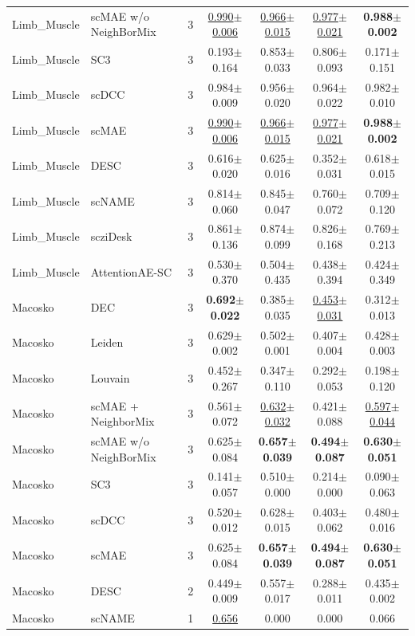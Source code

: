 \begin{table}[t]
\begin{tabular}{llrcccc}
Limb\_Muscle & scMAE w/o NeighBorMix & 3 & \underline{0.990$\pm$0.006} & \underline{0.966$\pm$0.015} & \underline{0.977$\pm$0.021} & \textbf{0.988$\pm$0.002} \\
Limb\_Muscle & SC3 & 3 & 0.193$\pm$0.164 & 0.853$\pm$0.033 & 0.806$\pm$0.093 & 0.171$\pm$0.151 \\
Limb\_Muscle & scDCC & 3 & 0.984$\pm$0.009 & 0.956$\pm$0.020 & 0.964$\pm$0.022 & 0.982$\pm$0.010 \\
Limb\_Muscle & scMAE & 3 & \underline{0.990$\pm$0.006} & \underline{0.966$\pm$0.015} & \underline{0.977$\pm$0.021} & \textbf{0.988$\pm$0.002} \\
Limb\_Muscle & DESC & 3 & 0.616$\pm$0.020 & 0.625$\pm$0.016 & 0.352$\pm$0.031 & 0.618$\pm$0.015 \\
Limb\_Muscle & scNAME & 3 & 0.814$\pm$0.060 & 0.845$\pm$0.047 & 0.760$\pm$0.072 & 0.709$\pm$0.120 \\
Limb\_Muscle & scziDesk & 3 & 0.861$\pm$0.136 & 0.874$\pm$0.099 & 0.826$\pm$0.168 & 0.769$\pm$0.213 \\
Limb\_Muscle & AttentionAE-SC & 3 & 0.530$\pm$0.370 & 0.504$\pm$0.435 & 0.438$\pm$0.394 & 0.424$\pm$0.349 \\
\midrule
Macosko & DEC & 3 & \textbf{0.692$\pm$0.022} & 0.385$\pm$0.035 & \underline{0.453$\pm$0.031} & 0.312$\pm$0.013 \\
Macosko & Leiden & 3 & 0.629$\pm$0.002 & 0.502$\pm$0.001 & 0.407$\pm$0.004 & 0.428$\pm$0.003 \\
Macosko & Louvain & 3 & 0.452$\pm$0.267 & 0.347$\pm$0.110 & 0.292$\pm$0.053 & 0.198$\pm$0.120 \\
Macosko & scMAE + NeighborMix & 3 & 0.561$\pm$0.072 & \underline{0.632$\pm$0.032} & 0.421$\pm$0.088 & \underline{0.597$\pm$0.044} \\
Macosko & scMAE w/o NeighBorMix & 3 & 0.625$\pm$0.084 & \textbf{0.657$\pm$0.039} & \textbf{0.494$\pm$0.087} & \textbf{0.630$\pm$0.051} \\
Macosko & SC3 & 3 & 0.141$\pm$0.057 & 0.510$\pm$0.000 & 0.214$\pm$0.000 & 0.090$\pm$0.063 \\
Macosko & scDCC & 3 & 0.520$\pm$0.012 & 0.628$\pm$0.015 & 0.403$\pm$0.062 & 0.480$\pm$0.016 \\
Macosko & scMAE & 3 & 0.625$\pm$0.084 & \textbf{0.657$\pm$0.039} & \textbf{0.494$\pm$0.087} & \textbf{0.630$\pm$0.051} \\
Macosko & DESC & 2 & 0.449$\pm$0.009 & 0.557$\pm$0.017 & 0.288$\pm$0.011 & 0.435$\pm$0.002 \\
Macosko & scNAME & 1 & \underline{0.656} & 0.000 & 0.000 & 0.066 \\

\end{tabular}
\end{table}
